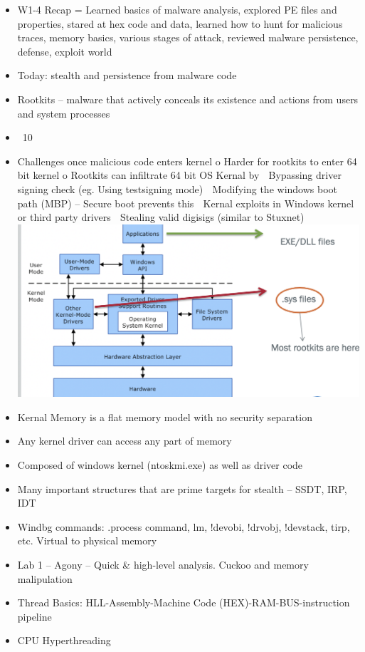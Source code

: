 \documentclass[12pt]{article}
\begin{document}
\begin{itemize}
\item W1-4 Recap = Learned basics of malware analysis, explored PE files and properties, stared at hex code and data, learned how to hunt for malicious traces, memory basics, various stages of attack, reviewed malware persistence, defense, exploit world
\item Today: stealth and persistence from malware code
\item Rootkits – malware that actively conceals its existence and actions from users and system processes
\item ~10%
\item Challenges once malicious code enters kernel
o	Harder for rootkits to enter 64 bit kernel
o	Rootkits can infiltrate 64 bit OS Kernal by
	Bypassing driver signing check (eg. Using testsigning mode)
	Modifying the windows boot path (MBP) – Secure boot prevents this
	Kernal exploits in Windows kernel or third party drivers
	Stealing valid digisigs (similar to Stuxnet)
\includegraphics{1.png}
\item Kernal Memory is a flat memory model with no security separation
\item Any kernel driver can access any part of memory
\item Composed of windows kernel (ntoskmi.exe) as well as driver code
\item Many important structures that are prime targets for stealth – SSDT, IRP, IDT
\item Windbg commands: .process command, lm, !devobi, !drvobj, !devstack, tirp, etc. Virtual to physical memory
\item Lab 1 – Agony – Quick & high-level analysis. Cuckoo and memory malipulation
\item Thread Basics: HLL-Assembly-Machine Code (HEX)-RAM-BUS-instruction pipeline
\item CPU Hyperthreading


\end{itemize}
\end{document}
